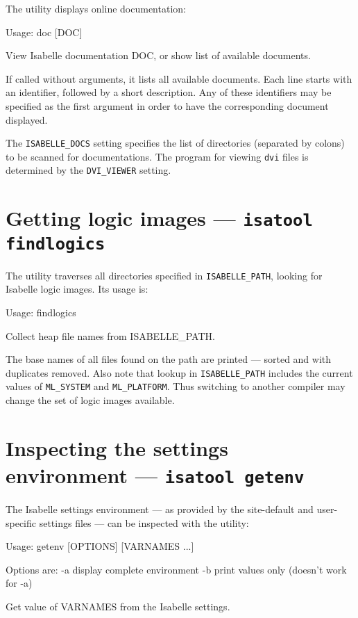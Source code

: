 The  utility displays online documentation:
\begin{ttbox}
Usage: doc [DOC]

  View Isabelle documentation DOC, or show list of available documents.
\end{ttbox}
If called without arguments, it lists all available documents. Each line
starts with an identifier, followed by a short description. Any of these
identifiers may be specified as the first argument in order to have the
corresponding document displayed.

\medskip The \texttt{ISABELLE_DOCS} setting specifies the list of directories
(separated by colons) to be scanned for documentations.  The program for
viewing \texttt{dvi} files is determined by the \texttt{DVI_VIEWER} setting.


\section{Getting logic images --- \texttt{isatool findlogics}}

The  utility traverses all directories specified in
\texttt{ISABELLE_PATH}, looking for Isabelle logic images. Its usage is:
\begin{ttbox}
Usage: findlogics

  Collect heap file names from ISABELLE_PATH.
\end{ttbox}
The base names of all files found on the path are printed --- sorted and with
duplicates removed. Also note that lookup in \texttt{ISABELLE_PATH} includes
the current values of \texttt{ML_SYSTEM} and \texttt{ML_PLATFORM}. Thus
switching to another {\ML} compiler may change the set of logic images
available.


\section{Inspecting the settings environment --- \texttt{isatool getenv}}
\label{sec:tool-getenv}

The Isabelle settings environment --- as provided by the site-default and
user-specific settings files --- can be inspected with the 
utility:
\begin{ttbox}
Usage: getenv [OPTIONS] [VARNAMES ...]

  Options are:
    -a           display complete environment
    -b           print values only (doesn't work for -a)

  Get value of VARNAMES from the Isabelle settings.
\end{ttbox}

